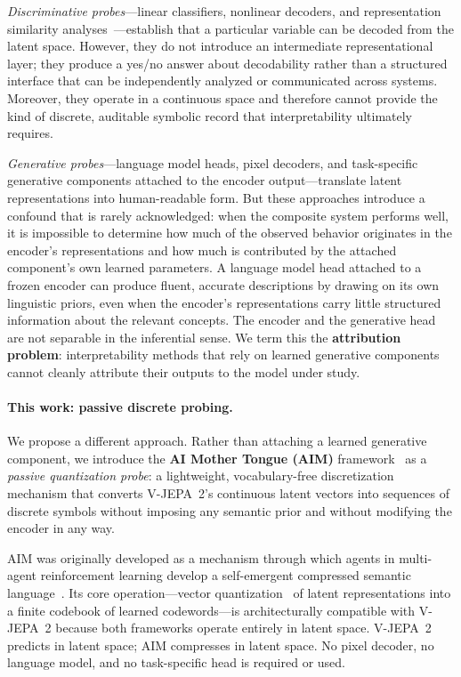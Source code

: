 \documentclass{article}
\begin{document}
\emph{Discriminative probes}---linear classifiers, nonlinear decoders,
and representation similarity analyses~\cite{alain2017probing,
tenney2019bert}---establish that a particular variable can be decoded
from the latent space.
However, they do not introduce an intermediate representational layer;
they produce a yes/no answer about decodability rather than a
structured interface that can be independently analyzed or communicated
across systems.
Moreover, they operate in a continuous space and therefore cannot
provide the kind of discrete, auditable symbolic record that
interpretability ultimately requires.

\emph{Generative probes}---language model heads, pixel decoders, and
task-specific generative components attached to the encoder
output---translate latent representations into human-readable form.
But these approaches introduce a confound that is rarely acknowledged:
when the composite system performs well, it is impossible to determine
how much of the observed behavior originates in the encoder's
representations and how much is contributed by the attached
component's own learned parameters.
A language model head attached to a frozen encoder can produce fluent,
accurate descriptions by drawing on its own linguistic priors, even
when the encoder's representations carry little structured information
about the relevant concepts.
The encoder and the generative head are not separable in the
inferential sense.
We term this the \textbf{attribution problem}: interpretability
methods that rely on learned generative components cannot cleanly
attribute their outputs to the model under study.

\paragraph{This work: passive discrete probing.}
We propose a different approach.
Rather than attaching a learned generative component, we introduce the
\textbf{AI Mother Tongue (AIM)} framework~\cite{liu2025aim} as a
\emph{passive quantization probe}: a lightweight, vocabulary-free
discretization mechanism that converts V-JEPA~2's continuous latent
vectors into sequences of discrete symbols without imposing any
semantic prior and without modifying the encoder in any way.

AIM was originally developed as a mechanism through which agents in
multi-agent reinforcement learning develop a self-emergent compressed
semantic language~\cite{liu2025aim}.
Its core operation---vector quantization~\cite{vandenoord2017vqvae}
of latent representations into a finite codebook of learned
codewords---is architecturally compatible with V-JEPA~2 because both
frameworks operate entirely in latent space.
V-JEPA~2 predicts in latent space; AIM compresses in latent space.
No pixel decoder, no language model, and no task-specific head is
required or used.
\end{document}
